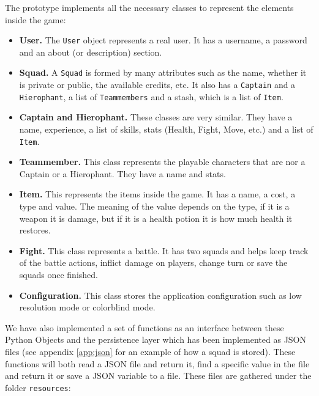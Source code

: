 \documentclass{article}
\begin{document}
The prototype implements all the necessary classes to represent the elements inside the game:
\begin{itemize}
	\item \textbf{User.} The \texttt{User} object represents a real user. It has a username, a password and an about (or description) section.
	\item \textbf{Squad.} A \texttt{Squad} is formed by many attributes such as the name, whether it is private or public, the available credits, etc. It also has a \texttt{Captain} and a \texttt{Hierophant}, a list of \texttt{Teammembers} and a stash, which is a list of \texttt{Item}.
	\item \textbf{Captain and Hierophant.} These classes are very similar. They have a name, experience, a list of skills, stats (Health, Fight, Move, etc.) and a list of \texttt{Item}.
	\item \textbf{Teammember.} This class represents the playable characters that are nor a Captain or a Hierophant. They have a name and stats.
	\item \textbf{Item.} This represents the items inside the game. It has a name, a cost, a type and value. The meaning of the value depends on the type, if it is a weapon it is damage, but if it is a health potion it is how much health it restores.
	\item \textbf{Fight.} This class represents a battle. It has two squads and helps keep track of the battle actions, inflict damage on players, change turn or save the squads once finished.
	\item \textbf{Configuration.} This class stores the application configuration such as low resolution mode or colorblind mode.
\end{itemize}

We have also implemented a set of functions as an interface between these Python Objects and the persistence layer which has been implemented as JSON files (see appendix \ref{app:json} for an example of how a squad is stored). These functions will both read a JSON file and return it, find a specific value in the file and return it or save a JSON variable to a file. These files are gathered under the folder \texttt{resources}:
\end{document}
